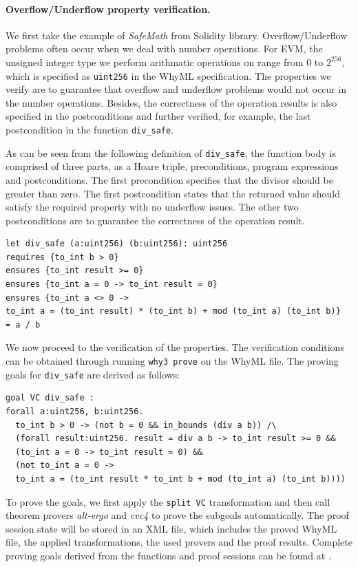 \documentclass[runningheads]{llncs}
\begin{document}
\paragraph{Overflow/Underflow property verification.}
We first take the example of \emph{SafeMath} from Solidity 
library. Overflow/Underflow problems often occur when we deal with number operations. For EVM, the unsigned integer type we 
perform arithmatic operations on range from 0 to $2^{256}$, which is specified as \texttt{uint256} in the WhyML specification.
The properties we verify are to guarantee that overflow and underflow problems would not occur in the number operations.
Besides, the correctness of the operation results is also specified in the postconditions and further verified, for example,
the last postcondition in the function \texttt{div\_safe}. 

As can be seen from the following definition of \texttt{div\_safe},
the function body is comprised of three parts, as a Hoare triple, 
preconditions, program expressions and postconditions.
The first precondition specifies that the divisor should be greater than
zero. The first postcondition states that the returned value should
satisfy the required property with no underflow issues. The other
two postconditions are to guarantee the correctness of the operation result. 
\begin{verbatim}
let div_safe (a:uint256) (b:uint256): uint256
requires {to_int b > 0}
ensures {to_int result >= 0}
ensures {to_int a = 0 -> to_int result = 0}
ensures {to_int a <> 0 -> 
to_int a = (to_int result) * (to_int b) + mod (to_int a) (to_int b)}
= a / b
\end{verbatim}

We now proceed to the verification of the properties. The verification conditions can be obtained 
through running \texttt{why3 prove} on the WhyML file. 
The proving goals for \texttt{div\_safe} are derived as follows:

\begin{verbatim}
goal VC div_safe :
forall a:uint256, b:uint256.
  to_int b > 0 -> (not b = 0 && in_bounds (div a b)) /\
  (forall result:uint256. result = div a b -> to_int result >= 0 &&
  (to_int a = 0 -> to_int result = 0) &&
  (not to_int a = 0 ->
  to_int a = (to_int result * to_int b + mod (to_int a) (to_int b))))
\end{verbatim}
To prove the goals, we first apply the \texttt{split VC} transformation and 
then call theorem provers \emph{alt-ergo} and \emph{cvc4} 
to prove the subgoals automatically. The proof session state will be 
stored in an XML file, which includes the proved WhyML file, the applied
transformations, the used provers and the proof results.
Complete proving goals derived from the functions and 
proof sessions can be found at \cite{Examples}.
\end{document}
